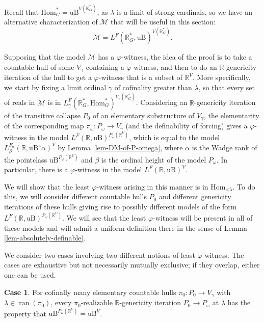 \documentclass[fleqn, 11pt]{amsart}
\theoremstyle{plain}
\theoremstyle{definition}
\newtheorem{case}{Case}
\theoremstyle{remark}
\newcommand{\Hom}{\mathrm{Hom}}
\newcommand{\uB}{\mathrm{uB}}
\newcommand{\bbR}{\mathbb{R}}
\newcommand{\restrict}{\mathord{\restriction}}
\DeclareMathOperator{\ran}{ran}
\begin{document}
Recall that $\Hom^*_G = \uB^{V(\mathbb{R}^*_G)}$, as $\lambda$ is a limit of strong cardinals, so we have an alternative characterization of $\mathcal{M}$ that will be useful in this section:
\[\mathcal{M} = L^F(\mathbb{R}^*_G, \uB)^{V(\mathbb{R}^*_G)}.\]

Supposing that the model $\mathcal{M}$ has a $\varphi$-witness, the idea of the proof is to take a countable hull of some $V_{\gamma}$ containing a $\varphi$-witness, and then to do an $\mathbb{R}$-genericity iteration of the hull to get a $\varphi$-witness that is a subset of $\mathbb{R}^V$. More specifically, we start by fixing a limit ordinal $\gamma$ of cofinality greater than $\lambda$, so that every set of reals in $\mathcal{M}$ is in $L_{\gamma}^{F}(\bbR^{*}_{G}, \Hom^{*}_{G})^{V_{\gamma}(\bbR^{*}_G)}$. Considering an $\bbR$-genericity iteration of the transitive collapse $P_{0}$ of an elementary substructure of $V_{\gamma}$, the elementarity of the corresponding map $\pi_\omega \colon P_\omega \to V_{\gamma}$ (and the definability of forcing) gives a $\varphi$-witness in the model $L^F(\mathbb{R},\uB)^{P_\omega(\mathbb{R}^V)}$, which is equal to the model $L_\beta^{F_\alpha}(\mathbb{R}, \uB\restrict \alpha)^V$ by Lemma \ref{lem-DM-of-P-omega}, where $\alpha$ is the Wadge rank of the pointclass $\uB^{P_\omega(\mathbb{R}^V)}$ and $\beta$ is the ordinal height of the model $P_\omega$.  In particular, there is a $\varphi$-witness in the model $L^F(\mathbb{R},\uB)^V$.

We will show that the least $\varphi$-witness arising in this manner is in $\Hom_{\mathord{<}\lambda}$. To do this, we will consider different countable hulls $P_0$ and different genericity iterations of these hulls giving rise to possibly different models of the form $L^F(\mathbb{R}, \uB)^{P_\omega(\mathbb{R}^V)}$. We will see that the least $\varphi$-witness will be present in all of these models and will admit a uniform definition there in the sense of  Lemma \ref{lem-absolutely-definable}.

We consider two cases involving two different notions of least $\varphi$-witness. The cases are exhaustive but not necessarily  mutually exclusive; if they overlap, either one can be used.

\begin{case}\label{case-all-of-uB}
For cofinally many elementary countable hulls $\pi_0 \colon P_0 \to V_{\gamma}$ with $\lambda \in \ran(\pi_0)$, every $\pi_0$-realizable $\mathbb{R}$-genericity iteration $P_0\to P_\omega$ at $\lambda$ has the property that $\uB^{P_\omega(\mathbb{R}^V)} = \uB^V$.
\end{case}
\end{document}
